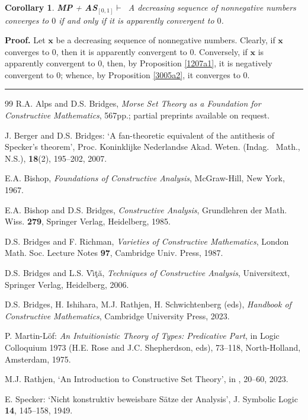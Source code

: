 \documentclass[11pt]{article}%
\newtheorem{corollary}[theorem]{Corollary}
\newenvironment{proof}[1][Proof]{\noindent\textbf{#1.} }{\ \rule{0.5em}{0.5em}}
\begin{document}
\begin{corollary}
\label{1207a1a}\emph{\textbf{MP} + \textbf{AS}}$_{\left[  0,1\right]  }%
\vdash\ $ A decreasing sequence of nonnegative numbers converges to $0$ if and
only if it is apparently convergent to $0$.
\end{corollary}

\begin{proof}
Let $\mathbf{x}$ be a decreasing sequence of nonnegative numbers. Clearly, if
$\mathbf{x}$ converges to $0$, then it is apparently convergent to $0$.
Conversely, if $\mathbf{x}$ is apparently convergent to $0$, then, by
Proposition \ref{1207a1}, it is negatively convergent to $0$; whence, by
Proposition \ref{3005a2}, it converges to $0$.
\end{proof}%

\bigskip
%

\bigskip


\begin{thebibliography}{99}                                                                                               %
R.A. Alps and D.S. Bridges, \emph{Morse Set Theory as a
Foundation for Constructive Mathematics}, 567pp.; partial preprints available
on request.

J. Berger and D.S. Bridges: `A fan-theoretic equivalent of the
antithesis of Specker's theorem', Proc. Koninklijke Nederlandse Akad. Weten.
(Indag. \ Math., N.S.), \textbf{18}(2), 195--202, 2007.

E.A. Bishop, \emph{Foundations of Constructive Analysis},
McGraw-Hill, New York, 1967.

E.A. Bishop and D.S. Bridges, \emph{Constructive Analysis},
Grundlehren der Math. Wiss. \textbf{279}, Springer Verlag, Heidelberg, 1985.

D.S. Bridges and F. Richman, \emph{Varieties of Constructive
Mathematics}, London Math. Soc. Lecture Notes \textbf{97}, Cambridge Univ.
Press, 1987.

D.S. Bridges and L.S. V\^{\i}\c{t}\u{a}, \emph{Techniques of
Constructive Analysis}, Universitext, Springer Verlag, Heidelberg, 2006.

D.S. Bridges, H. Ishihara, M.J. Rathjen, H. Schwichtenberg
(eds), \emph{Handbook of Constructive Mathematics}, Cambridge University
Press, 2023.

P. Martin-L\"{o}f: \emph{An Intuitionistic Theory of Types:
Predicative Part}, in Logic Colloquium 1973 (H.E. Rose and J.C. Shepherdson,
eds), 73--118, North-Holland, Amsterdam, 1975.

M.J. Rathjen, `An Introduction to Constructive Set Theory',
in \cite{Handbook}, 20--60, 2023.

E. Specker: `Nicht konstruktiv beweisbare S\"{a}tze der
Analysis', J. Symbolic Logic \textbf{14}, 145--158, 1949.
\end{thebibliography}%
\end{document}
